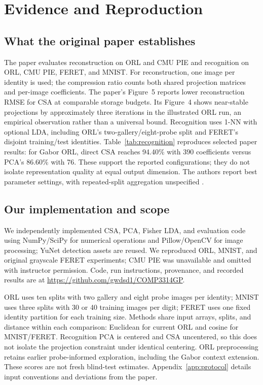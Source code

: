\section{Evidence and Reproduction}
\label{sec:evidence}
\subsection{What the original paper establishes}
\label{sec:csa-paper-evidence}
The paper evaluates reconstruction on ORL and CMU PIE and recognition on ORL,
CMU PIE, FERET, and MNIST. For reconstruction, one image per identity is used;
the compression ratio counts both shared projection matrices and per-image
coefficients. The paper's Figure~5 reports lower reconstruction RMSE for CSA at comparable
storage budgets. Its Figure~4 shows near-stable projections by approximately three
iterations in the illustrated ORL run, an empirical observation rather than a
universal bound. Recognition uses 1-NN with optional LDA, including ORL's
two-gallery/eight-probe split and FERET's disjoint training/test identities.
Table~\ref{tab:recognition} reproduces selected paper results: for Gabor ORL,
direct CSA reaches 94.40\% with 390 coefficients versus PCA's 86.60\% with 76.
These support the reported configurations; they do not isolate representation
quality at equal output dimension. The authors report best parameter settings,
with repeated-split aggregation unspecified \citep[Sec.~IV]{xu2008csa}.

\subsection{Our implementation and scope}
We independently implemented CSA, PCA, Fisher LDA, and evaluation code using
NumPy/SciPy for numerical operations and Pillow/OpenCV for image processing;
YuNet detection assets are reused. We reproduced ORL, MNIST, and original
grayscale FERET experiments; CMU PIE was unavailable and omitted with instructor
permission. Code, run instructions, provenance, and recorded results are at
\url{https://github.com/gwdsd1/COMP3314GP}.

ORL uses ten splits with two gallery and eight probe images per identity;
MNIST uses three splits with 30 or 40 training images per digit; FERET uses one
fixed identity partition for each training size. Methods share input arrays,
splits, and distance within each comparison: Euclidean for current ORL and
cosine for MNIST/FERET. Recognition PCA is centered and CSA uncentered, so this
does not isolate the projection constraint under identical centering.
ORL preprocessing retains earlier probe-informed exploration, including the
Gabor context extension. These scores are not fresh blind-test estimates.
Appendix~\ref{app:protocol} details input conventions and deviations from the paper.

